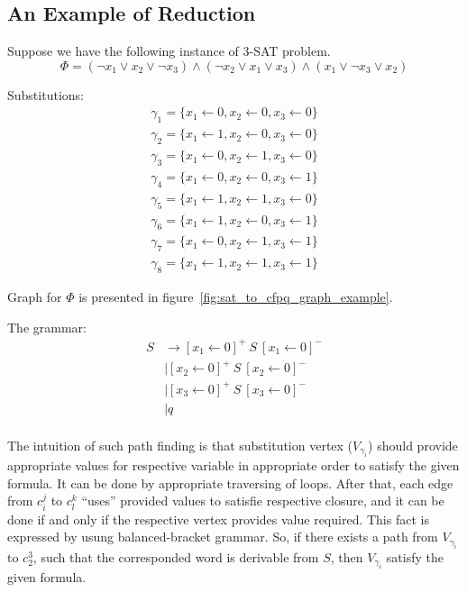 \subsection{An Example of Reduction}

Suppose we have the following instance of 3-SAT problem. 
$$
\Phi = (\neg x_1 \vee x_2 \vee \neg x_3) \wedge (\neg x_2 \vee x_1 \vee x_3) \wedge (x_1 \vee \neg x_3 \vee x_2)
$$

Substitutions:
\begin{align*}
\gamma_1 = \{x_1 \leftarrow 0, x_2 \leftarrow 0, x_3 \leftarrow 0\} \\
\gamma_2 = \{x_1 \leftarrow 1, x_2 \leftarrow 0, x_3 \leftarrow 0\} \\
\gamma_3 = \{x_1 \leftarrow 0, x_2 \leftarrow 1, x_3 \leftarrow 0\} \\
\gamma_4 = \{x_1 \leftarrow 0, x_2 \leftarrow 0, x_3 \leftarrow 1\} \\
\gamma_5 = \{x_1 \leftarrow 1, x_2 \leftarrow 1, x_3 \leftarrow 0\} \\
\gamma_6 = \{x_1 \leftarrow 1, x_2 \leftarrow 0, x_3 \leftarrow 1\} \\
\gamma_7 = \{x_1 \leftarrow 0, x_2 \leftarrow 1, x_3 \leftarrow 1\} \\
\gamma_8 = \{x_1 \leftarrow 1, x_2 \leftarrow 1, x_3 \leftarrow 1\} 
\end{align*}

Graph for $\Phi$ is presented in figure~\ref{fig:sat_to_cfpq_graph_example}.

The grammar:
\begin{align*}
S & \to  [x_1 \leftarrow 0]^+ \ S \ [x_1 \leftarrow 0]^- \\
  & \mid [x_2 \leftarrow 0]^+ \ S \ [x_2 \leftarrow 0]^- \\ 
  & \mid [x_3 \leftarrow 0]^+ \ S \ [x_3 \leftarrow 0]^- \\ 
  & \mid q \\
\end{align*}

The intuition of such path finding is that substitution vertex ($V_{\gamma_i}$) should provide appropriate values for respective variable in appropriate order to satisfy the given formula.
It can be done by appropriate traversing of loops. 
After that, each edge from $c_i^j$ to  $c_l^k$ ``uses'' provided values to satisfie respective closure, and it can be done if and only if the respective vertex provides value required.
This fact is expressed by usung balanced-bracket grammar.
So, if there exists a path from $V_{\gamma_i}$ to $c_2^3$, such that the corresponded word is derivable from $S$, then $V_{\gamma_i}$ satisfy the given formula. 



